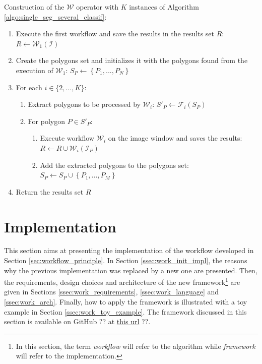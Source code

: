 \begin{algorithm} \label{algo:chaining_workflows}
	Construction of the $\mathcal{W}$ operator with $K$ instances of Algorithm \ref{algo:single_seg_several_classif}:

	\begin{enumerate}
		\item Execute the first workflow and save the results in the results set $R$: $R \leftarrow \mathcal{W}_1(\mathcal{I})$
		\item Create the polygons set and initializes it with the polygons found from the execution of $\mathcal{W}_1$: $S_P \leftarrow \left\{P_1, ..., P_N\right\}$
		\item For each $i \in \{2, ..., K\}$:
		\begin{enumerate}
			\item Extract polygons to be processed by $\mathcal{W}_i$: $S'_P \leftarrow \mathcal{F}_i(S_P)$
			\item For polygon $P \in S'_P$:
			\begin{enumerate}
				\item Execute workflow $\mathcal{W}_i$ on the image window and saves the results: $R \leftarrow R \cup \mathcal{W}_i(\mathcal{I}_P)$
				\item Add the extracted polygons to the polygons set: $S_P \leftarrow S_P \cup \left\{P_1, ..., P_M\right\}$
			\end{enumerate}
		\end{enumerate}
		\item Return the results set $R$
	\end{enumerate}
\end{algorithm}

\section{Implementation}
\label{sec:workflow_impl}
This section aims at presenting the implementation of the workflow developed in Section \ref{sec:workflow_principle}. In Section \ref{ssec:work_init_impl}, the reasons why the previous implementation was replaced by a new one are presented. Then, the requirements, design choices and architecture of the new framework\footnote{In this section, the term \textit{workflow} will refer to the algorithm while \textit{framework} will refer to the implementation.} are given in Sections \ref{ssec:work_requirements}, \ref{ssec:work_language} and \ref{ssec:work_arch}. Finally, how to apply the framework is illustrated with a toy example in Section \ref{ssec:work_toy_example}. The framework discussed in this section is available on GitHub ?? at \href{https://github.com/waliens/sldc}{this url} ??.

